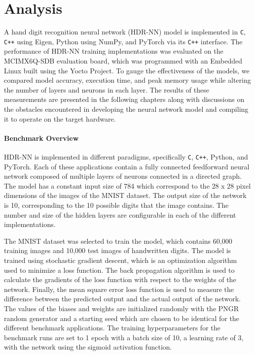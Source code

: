 \part{Analysis}

A hand digit recognition neural network (HDR-NN) model is implemented in \texttt{C}, \texttt{C++} using Eigen, Python using NumPy, and PyTorch via its \texttt{C++} interface. The performance of HDR-NN training implementations was evaluated on the MCIMX6Q-SDB evaluation board, which was programmed with an Embedded Linux built using the Yocto Project. To gauge the effectiveness of the models, we compared model accuracy, execution time, and peak memory usage while altering the number of layers and neurons in each layer. The results of these measurements are presented in the following chapters along with discussions on the obstacles encountered in developing the neural network model and compiling it to operate on the target hardware.

\subsection*{Benchmark Overview}

HDR-NN is implemented in different paradigms, specifically \texttt{C}, \texttt{C++}, Python, and PyTorch. Each of these applications contain a fully connected feedforward neural network composed of multiple layers of neurons connected in a directed graph. The model has a constant input size of 784 which correspond to the 28 x 28 pixel dimensions of the images of the MNIST dataset. The output size of the network is 10, corresponding to the 10 possible digits that the image contains. The number and size of the hidden layers are configurable in each of the different implementations.

The MNIST dataset was selected to train the model, which contains 60,000 training images and 10,000 test images of handwritten digits. The model is trained using stochastic gradient descent, which is an optimization algorithm used to minimize a loss function. The back propagation algorithm is used to calculate the gradients of the loss function with respect to the weights of the network. Finally, the mean square error loss function is used to measure the difference between the predicted output and the actual output of the network. The values of the biases and weights are initialized randomly with the PNGR random generator and a starting seed which are chosen to be identical for the different benchmark applications. The training hyperparameters for the benchmark runs are set to 1 epoch with a batch size of 10, a learning rate of 3, with the network using the sigmoid activation function.

